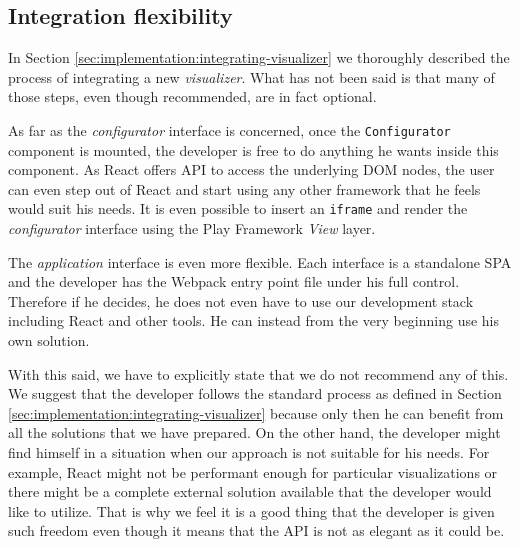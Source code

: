 \subsection{Integration flexibility}

In Section \ref{sec:implementation:integrating-visualizer} we thoroughly described the process of integrating a new \emph{visualizer}. What has not been said is that many of those steps, even though recommended, are in fact optional.

As far as the \emph{configurator} interface is concerned, once the \texttt{Configurator} component is mounted, the developer is free to do anything he wants inside this component. As React offers API to access the underlying DOM nodes, the user can even step out of React and start using any other framework that he feels would suit his needs. It is even possible to insert an \texttt{iframe} and render the \emph{configurator} interface using the Play Framework \emph{View} layer.

The \emph{application} interface is even more flexible. Each interface is a standalone SPA and the developer has the Webpack entry point file under his full control. Therefore if he decides, he does not even have to use our development stack including React and other tools. He can instead from the very beginning use his own solution.

With this said, we have to explicitly state that we do not recommend any of this. We suggest that the developer follows the standard process as defined in Section \ref{sec:implementation:integrating-visualizer} because only then he can benefit from all the solutions that we have prepared. On the other hand, the developer might find himself in a situation when our approach is not suitable for his needs. For example, React might not be performant enough for particular visualizations or there might be a complete external solution available that the developer would like to utilize. That is why we feel it is a good thing that the developer is given such freedom even though it means that the API is not as elegant as it could be.
   